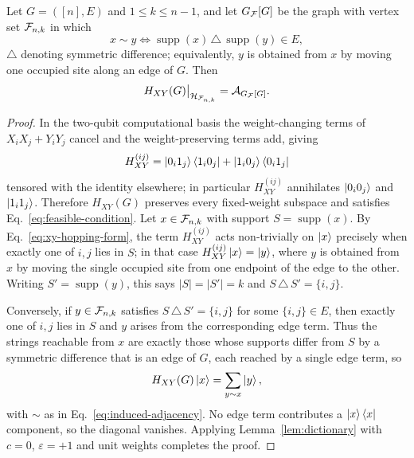 \begin{proposition}
\label{prop:xy-hopping}
Let $G=([n],E)$ and $1\le k\le n-1$, and let $G_{\mathcal{F}}[G]$ be the graph with vertex set $\mathcal{F}_{n,k}$ in which
\begin{equation}
    x\sim y
    \iff
    \operatorname{supp}(x)\,\triangle\,\operatorname{supp}(y)\in E ,
    \label{eq:induced-adjacency}
\end{equation}
$\triangle$ denoting symmetric difference; equivalently, $y$ is obtained from $x$ by moving one occupied site along an edge of $G$. Then
\begin{equation}
    H_{XY}(G)\big|_{\mathcal{H}_{\mathcal{F}_{n,k}}}
    =
    \mathcal{A}_{G_{\mathcal{F}}[G]} .
    \label{eq:xy-hopping}
\end{equation}
\end{proposition}

\begin{proof}
In the two-qubit computational basis the weight-changing terms of $X_iX_j+Y_iY_j$ cancel and the weight-preserving terms add, giving
\begin{equation}
    H^{(ij)}_{XY}
    =
    \ket{0_i1_j}\bra{1_i0_j}+\ket{1_i0_j}\bra{0_i1_j}
    \label{eq:xy-hopping-form}
\end{equation}
tensored with the identity elsewhere; in particular $H^{(ij)}_{XY}$ annihilates $\ket{0_i0_j}$ and $\ket{1_i1_j}$. Therefore $H_{XY}(G)$ preserves every fixed-weight subspace and satisfies Eq.~\eqref{eq:feasible-condition}. Let $x\in\mathcal{F}_{n,k}$ with support $S=\operatorname{supp}(x)$. By Eq.~\eqref{eq:xy-hopping-form}, the term $H^{(ij)}_{XY}$ acts non-trivially on $\ket{x}$ precisely when exactly one of $i,j$ lies in $S$; in that case $H^{(ij)}_{XY}\ket{x}=\ket{y}$, where $y$ is obtained from $x$ by moving the single occupied site from one endpoint of the edge to the other. Writing $S'=\operatorname{supp}(y)$, this says $|S|=|S'|=k$ and $S\,\triangle\,S'=\{i,j\}$.

Conversely, if $y\in\mathcal{F}_{n,k}$ satisfies $S\,\triangle\,S'=\{i,j\}$ for some $\{i,j\}\in E$, then exactly one of $i,j$ lies in $S$ and $y$ arises from the corresponding edge term. Thus the strings reachable from $x$ are exactly those whose supports differ from $S$ by a symmetric difference that is an edge of $G$, each reached by a single edge term, so
\begin{equation}
    H_{XY}(G)\ket{x}=\sum_{y\sim x}\ket{y},
\end{equation}
with $\sim$ as in Eq.~\eqref{eq:induced-adjacency}. No edge term contributes a $\ket{x}\bra{x}$ component, so the diagonal vanishes. Applying Lemma~\ref{lem:dictionary} with $c=0$, $\varepsilon=+1$ and unit weights completes the proof.
\end{proof}


